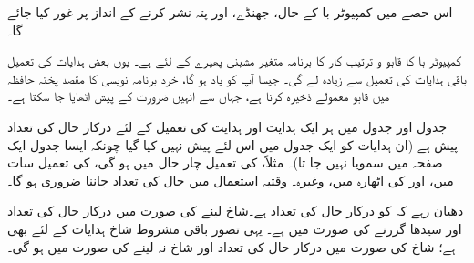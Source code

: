 اس حصے میں کمپیوٹر با کے  حال، جھنڈے، اور  پتہ نشر کرنے کے انداز پر غور کیا جائے گا۔

کمپیوٹر با کا قابو و ترتیب کار کا برنامہ  متغیر مشینی پھیرے کے لئے   ہے۔ یوں بعض ہدایات کی تعمیل باقی ہدایات کی تعمیل سے  زیادہ  لے گی۔ جیسا آپ کو یاد ہو گا، خرد برنامہ نویسی کا مقصد پختہ حافظہ میں قابو  معمولے ذخیرہ کرنا ہے، جہاں سے انہیں ضرورت کے پیش  اٹھایا جا سکتا ہے۔

جدول   اور جدول   میں  ہر ایک ہدایت  اور ہدایت کی تعمیل کے لئے درکار  حال کی تعداد پیش ہے (ان ہدایات کو ایک جدول میں اس لئے پیش نہیں کیا گیا چونکہ ایسا  جدول ایک صفحہ میں سمویا نہیں جا تا)۔ مثلاً، \ADD{\regB} کی تعمیل چار  حال میں ہو گی،  کی تعمیل  سات میں،  اور \sCALL کی اٹھارہ میں، وغیرہ۔ وقتیہ استعمال میں  حال کی تعداد جاننا ضروری ہو گا۔

دھیان رہے کہ \sJM کو  درکار  حال  کی تعداد  ہے۔شاخ لینے کی صورت میں درکار   حال کی تعداد  اور سیدھا گزرنے کی صورت میں  ہے۔ یہی تصور باقی مشروط شاخ ہدایات کے لئے بھی  ہے؛ شاخ  کی صورت میں درکار  حال کی تعداد    اور شاخ نہ لینے کی صورت میں  ہو گی۔


